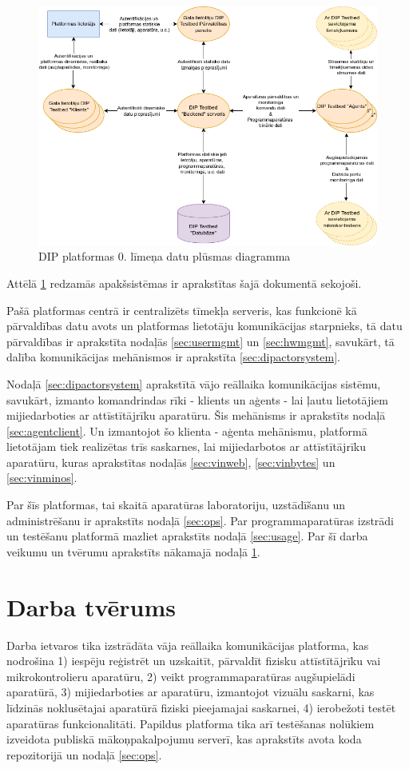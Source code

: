 \begin{figure}[H]
    \includegraphics[width=0.7\linewidth]{assets/DPD0.drawio.png}
    \centering
    \caption{DIP platformas 0. līmeņa datu plūsmas diagramma}
    \label{fig:dipdpd0}
\end{figure}

Attēlā \ref{fig:dipdpd0} redzamās apakšsistēmas ir aprakstītas šajā dokumentā
sekojoši. 

Pašā platformas centrā ir centralizēts tīmekļa serveris, kas funkcionē
kā pārvaldības datu avots un platformas lietotāju komunikācijas starpnieks, tā
datu pārvaldības ir aprakstīta nodaļās \ref{sec:usermgmt} un \ref{sec:hwmgmt},
savukārt, tā dalība komunikācijas mehānismos ir aprakstīta \ref{sec:dipactorsystem}.

Nodaļā \ref{sec:dipactorsystem} aprakstītā vājo reāllaika komunikācijas sistēmu,
savukārt, izmanto komandrindas rīki - klients un aģents - lai ļautu lietotājiem
mijiedarboties ar attīstītājrīku aparatūru. Šis mehānisms ir aprakstīts nodaļā
\ref{sec:agentclient}. Un izmantojot šo klienta - aģenta mehānismu, platformā
lietotājam tiek realizētas trīs saskarnes, lai mijiedarbotos ar attīstītājrīku
aparatūru, kuras aprakstītas nodaļās \ref{sec:vinweb}, \ref{sec:vinbytes} un
\ref{sec:vinminos}.

Par šīs platformas, tai skaitā aparatūras laboratoriju, uzstādīšanu un
administrēšanu ir aprakstīts nodaļā \ref{sec:ops}. Par programmaparatūras
izstrādi un testēšanu platformā mazliet aprakstīts nodaļā \ref{sec:usage}. Par
šī darba veikumu un tvērumu aprakstīts nākamajā nodaļā \ref{sec:scope}.

\section{Darba tvērums}
\label{sec:scope}

Darba ietvaros tika izstrādāta vāja reāllaika komunikācijas platforma, kas
nodrošina 1) iespēju reģistrēt un uzskaitīt, pārvaldīt fizisku attīstītājrīku
vai mikrokontrolieru aparatūru, 2) veikt programmaparatūras augšupielādi
aparatūrā, 3) mijiedarboties ar aparatūru, izmantojot vizuālu saskarni, kas
līdzinās noklusētajai aparatūrā fiziski pieejamajai saskarnei, 4) ierobežoti
testēt aparatūras funkcionalitāti. Papildus platforma tika arī testēšanas
nolūkiem izveidota publiskā mākoņpakalpojumu serverī, kas aprakstīts avota koda
repozitorijā un nodaļā \ref{sec:ops}. \cite{VeinbahsKrisjanisTestbed}
\cite{VeinbahsKrisjanisProduction}

